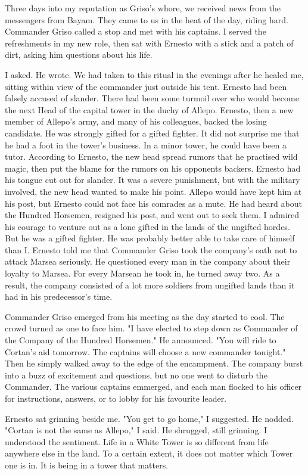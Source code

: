 \documentclass{article}
\begin{document}
Three days into my reputation as Griso's whore, we received news from the messengers from Bayam. They came to us in the heat of the day, riding hard. Commander Griso called a stop and met with his captains. I served the refreshments in my new role, then sat with Ernesto with a stick and a patch of dirt, asking him questions about his life. 

I asked. He wrote. We had taken to this ritual in the evenings after he healed me, sitting within view of the commander just outside his tent.  Ernesto had been falsely accused of slander. There had been some turmoil over who would become the next Head of the capital tower in the duchy of Allepo. Ernesto, then a new member of Allepo's army, and many of his colleagues, backed the losing candidate. He was strongly gifted for a gifted fighter. It did not surprise me that he had a foot in the tower's business. In a minor tower, he could have been a tutor. According to Ernesto, the new head spread rumors that he practised wild magic, then put the blame for the rumors on his opponents backers. Ernesto had his tongue cut out for slander. It was a severe punishment, but with the military involved, the new head wanted to make his point. Allepo would have kept him at his post, but Ernesto could not face his comrades as a mute. He had heard about the Hundred Horsemen, resigned his post, and went out to seek them. I admired his courage to venture out as a lone gifted in the lands of the ungifted hordes. But he was a gifted fighter. He was probably better able to take care of himself than I. Ernesto told me that Commander Griso took the company's oath not to attack Marsea seriously. He questioned every man in the company about their loyalty to Marsea. For every Marsean he took in, he turned away two. As a result, the company consisted of a lot more soldiers from ungifted lands than it had in his predecessor's time.

Commander Griso emerged from his meeting as the day started to cool. The crowd turned as one to face him. "I have elected to step down as Commander of the Company of the Hundred Horsemen." He announced. "You will ride to Cortan's aid tomorrow. The captains will choose a new commander tonight." Then he simply walked away to the edge of the encampment. The company burst into a buzz of excitement and questions, but no one went to disturb the Commander. The various captains emmerged, and each man flocked to his officer for instructions, answers, or to lobby for his favourite leader. 

Ernesto sat grinning beside me. "You get to go home," I suggested. He nodded. "Cortan is not the same as Allepo," I said. He shrugged, still grinning. I understood the sentiment. Life in a White Tower is so different from life anywhere else in the land. To a certain extent, it does not matter which Tower one is in. It is being in a tower that matters. 
\end{document}

